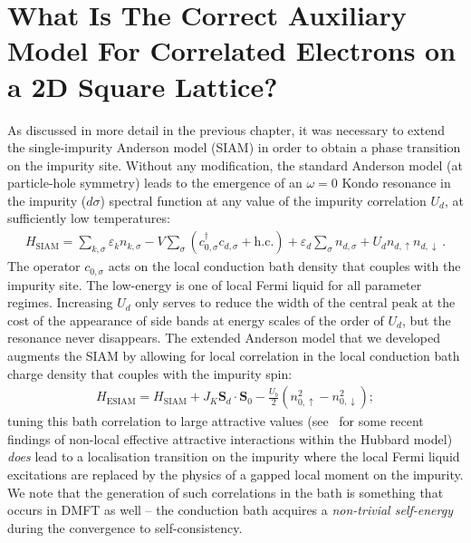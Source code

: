 \section{What Is The Correct Auxiliary Model For Correlated Electrons on a 2D Square Lattice?}\label{identifyModel}
As discussed in more detail in the previous chapter, it was necessary to extend the single-impurity Anderson model (SIAM) in order to obtain a phase transition on the impurity site. Without any modification, the standard Anderson model (at particle-hole symmetry) leads to the emergence of an \(\omega=0\) Kondo resonance in the impurity (\(d\sigma\)) spectral function at any value of the impurity correlation \(U_d\), at sufficiently low temperatures:
\begin{equation}\begin{aligned}
	H_\text{SIAM} = \sum_{k,\sigma}\varepsilon_k n_{k,\sigma} - V\sum_{\sigma}(c^\dagger_{0,\sigma}c_{d,\sigma} + \text{h.c.}) + \varepsilon_d \sum_\sigma n_{d,\sigma} + U_dn_{d, \uparrow}n_{d,\downarrow}~.
\end{aligned}\end{equation}
The operator \(c_{0,\sigma}\) acts on the local conduction bath density that couples with the impurity site. The low-energy is one of local Fermi liquid for all parameter regimes. Increasing \(U_d\) only serves to reduce the width of the central peak at the cost of the appearance of side bands at energy scales of the order of \(U_d\), but the resonance never disappears. The extended Anderson model that we developed augments the SIAM by allowing for local correlation in the local conduction bath charge density that couples with the impurity spin:
\begin{equation}\begin{aligned}\label{eSIAM}
	H_\text{ESIAM} = H_\text{SIAM} + J_K {\bm S}_d \cdot {\bm S}_0 - \frac{U_b}{2}\left(n_{0, \uparrow}^2 - n_{0, \downarrow}^2\right);
\end{aligned}\end{equation}
tuning this bath correlation to large attractive values (see~\cite{gazizovaleblanc2023} for some recent findings of non-local effective attractive interactions within the Hubbard model) {\it does} lead to a localisation transition on the impurity where the local Fermi liquid excitations are replaced by the physics of a gapped local moment on the impurity.
We note that the generation of such correlations in the bath is something that occurs in DMFT as well -- the conduction bath acquires a {\it non-trivial self-energy} during the convergence to self-consistency.


